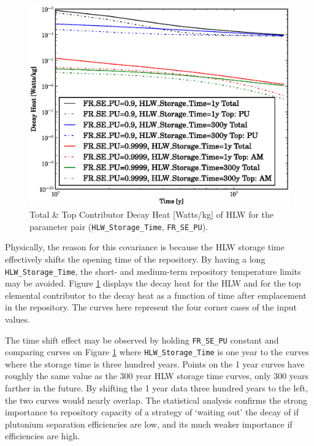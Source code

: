 \begin{figure}[htbp]
\begin{center}
\includegraphics[scale=0.70]{ct_sensitivity/figs/FR_SE_PU_and_HLW_Storage_Time_Decay_Heat.eps}
\caption{Total \& Top Contributor Decay Heat [Watts/kg] of HLW for the parameter pair (\texttt{HLW\_Storage\_Time}, \texttt{FR\_SE\_PU}).}
\label{hlw_pu_decay_heat}
\end{center}
\end{figure}

Physically, the reason for this covariance is because the HLW storage 
time effectively shifts the opening time of the repository.
By having a long \texttt{HLW\_Storage\_Time}, the short- and medium-term 
repository temperature limits may be avoided.
Figure \ref{hlw_pu_decay_heat} displays the decay heat for the HLW and for 
the top elemental contributor to the decay heat as a
function of time after emplacement in the repository.  The curves here 
represent the four corner cases of the input values.

The time shift effect may be observed by holding \texttt{FR\_SE\_PU} constant 
and comparing curves on Figure \ref{hlw_pu_decay_heat}
where \texttt{HLW\_Storage\_Time} is one year to the curves where the storage 
time is three hundred years.  Points on the 1 year curves have
roughly the same value as the 300 year HLW storage time curves, only 300 years 
farther in the future.  By shifting the 1 year data
three hundred years to the left, the two curves would nearly overlap.  The 
statistical analysis confirms the strong importance to repository capacity 
of a strategy of `waiting out' the decay of  if plutonium separation efficiencies 
are low, and its much weaker importance if efficiencies are high.


